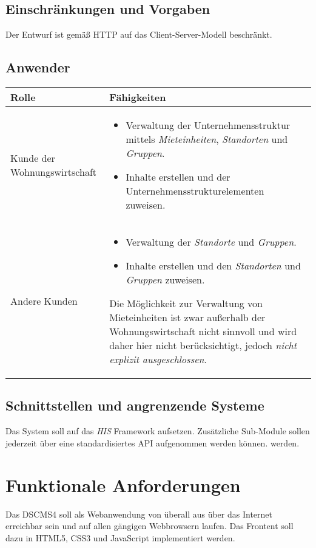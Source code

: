 \documentclass[a4paper]{article}
\begin{document}
	\subsection{Einschränkungen und Vorgaben}
	Der Entwurf ist gemäß HTTP auf das Client-Server-Modell beschränkt.
	
	\subsection{Anwender}	
	\begin{tabular}{|p{}|p{}|}
	\hline
	Rolle & Fähigkeiten \\
	\hline
	Kunde der Wohnungswirtschaft &
		\begin{itemize}
		\item Verwaltung der Unternehmensstruktur mittels \emph{Mieteinheiten}, \emph{Standorten} und \emph{Gruppen}.
		\item Inhalte erstellen und der Unternehmensstrukturelementen zuweisen.
		\end{itemize} \\
	\hline
	Andere Kunden & 
		\begin{itemize}
		\item Verwaltung der \emph{Standorte} und \emph{Gruppen}.
		\item Inhalte erstellen und den \emph{Standorten} und \emph{Gruppen} zuweisen.
		\end{itemize}
		Die Möglichkeit zur Verwaltung von Mieteinheiten ist zwar außerhalb der Wohnungswirtschaft nicht sinnvoll und wird daher hier nicht berücksichtigt, jedoch \emph{nicht explizit ausgeschlossen}. \\
	\hline
	\end{tabular}
	\subsection{Schnittstellen und angrenzende Systeme}
	Das System soll auf das \emph{HIS} Framework aufsetzen.
	Zusätzliche Sub-Module sollen jederzeit über eine standardisiertes API aufgenommen werden können. werden.
	\pagebreak
	
	\section{Funktionale Anforderungen}
	Das DSCMS4 soll als Webanwendung von überall aus über das Internet erreichbar sein und auf allen gängigen Webbrowsern laufen.
	Das Frontent soll dazu in HTML5, CSS3 und JavaScript implementiert werden.
\end{document}
